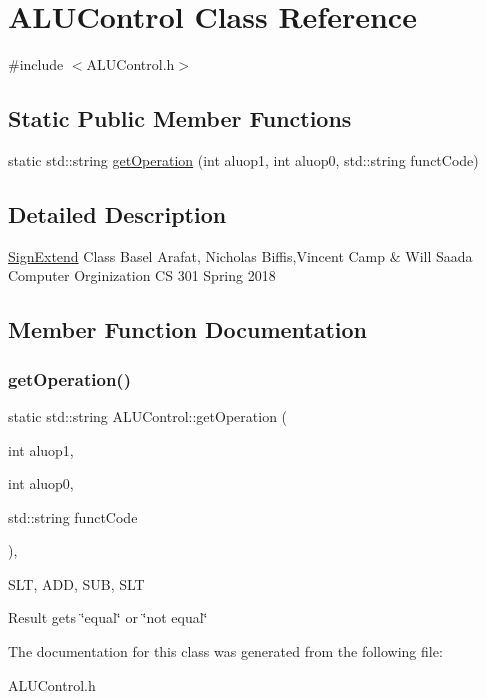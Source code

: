 \hypertarget{class_a_l_u_control}{}\section{A\+L\+U\+Control Class Reference}
\label{class_a_l_u_control}


{\ttfamily \#include $<$A\+L\+U\+Control.\+h$>$}

\subsection*{Static Public Member Functions}
\begin{DoxyCompactItemize}
\item 
static std\+::string \mbox{\hyperlink{class_a_l_u_control_ac6410279398ad20482ef636d52549e9b}{get\+Operation}} (int aluop1, int aluop0, std\+::string funct\+Code)
\end{DoxyCompactItemize}


\subsection{Detailed Description}
\mbox{\hyperlink{class_sign_extend}{Sign\+Extend}} Class Basel Arafat, Nicholas Biffis,Vincent Camp \& Will Saada Computer Orginization CS 301 Spring 2018 

\subsection{Member Function Documentation}
\mbox{\label{class_a_l_u_control_ac6410279398ad20482ef636d52549e9b}} 
\subsubsection{\texorpdfstring{get\+Operation()}{getOperation()}}
{\footnotesize\ttfamily static std\+::string A\+L\+U\+Control\+::get\+Operation (\begin{DoxyParamCaption}\item[{int}]{aluop1,  }\item[{int}]{aluop0,  }\item[{std\+::string}]{funct\+Code }\end{DoxyParamCaption})\hspace{0.3cm}{\ttfamily [inline]}, {\ttfamily [static]}}

S\+LT, A\+DD, S\+UB, S\+LT

Result gets \char`\"{}equal\char`\"{} or \char`\"{}not equal\char`\"{} 

The documentation for this class was generated from the following file\+:\begin{DoxyCompactItemize}
\item 
A\+L\+U\+Control.\+h\end{DoxyCompactItemize}
